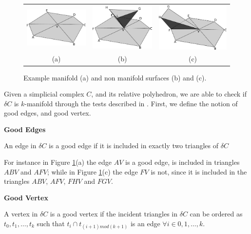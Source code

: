 \begin{figure}
 \begin{tabular}{ccc}
  \includegraphics[width=0.3\columnwidth]{./img/manifold}&
  \includegraphics[width=0.3\columnwidth]{./img/notmanifold1}&
  \includegraphics[width=0.3\columnwidth]{./img/notmanifold2}\\
  (a) & (b) & (c)
 \end{tabular}
 \caption{Example manifold (a) and non manifold surfaces (b) and (c).}
 \label{fig:manif}
 
\end{figure}




Given a simplicial complex $C$, and its relative polyhedron, we are able to check if $\delta C$ is $k$-manifold through the tests described in \cite{lhuillier20152}.
First, we define the notion of good edges, and good vertex.


\begin{mydef}
\textbf{Good Edges}

An edge in $\delta C$ is a good edge if it is included in exactly two triangles of $\delta C$
\end{mydef}

For instance in Figure \ref{fig:manif}(a) the edge $AV$  is a good edge, is included in triangles $ABV$ and $AFV$; while in Figure \ref{fig:manif}(c) the edge $FV$ is not, since it is included in the triangles $ABV$, $AFV$, $FHV$ and $FGV$.

\begin{mydef}
\textbf{Good Vertex}

A vertex in $\delta C$  is a good vertex if the incident triangles in $\delta C$  can be ordered as
$t_0 , t_1, \dots, t_k$ such that $t_i \cap t_{(i+1) mod (k+1)}$ is an edge $\forall i \in {0, 1, \dots, k}$.
\end{mydef}

